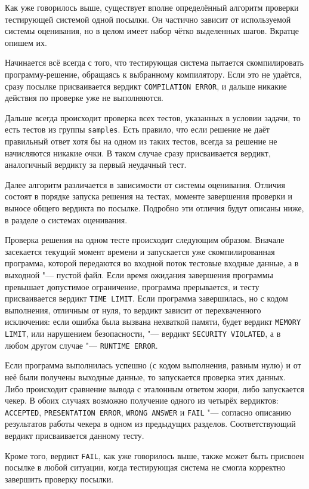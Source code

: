 Как уже говорилось выше, существует вполне определённый алгоритм проверки тестирующей системой одной посылки. Он частично зависит от используемой системы оценивания, но в целом имеет набор чётко выделенных шагов. Вкратце опишем их.

Начинается всё всегда с того, что тестирующая система пытается скомпилировать программу-решение, обращаясь к выбранному компилятору. Если это не удаётся, сразу посылке присваивается вердикт \texttt{COMPILATION ERROR}, и дальше никакие действия по проверке уже не выполняются.

Дальше всегда происходит проверка всех тестов, указанных в условии задачи, то есть тестов из группы \texttt{samples}. Есть правило, что если решение не даёт правильный ответ хотя бы на одном из таких тестов, всегда за решение не начисляются никакие очки. В таком случае сразу присваивается вердикт, аналогичный вердикту за первый неудачный тест.

Далее алгоритм различается в зависимости от системы оценивания. Отличия состоят в порядке запуска решения на тестах, моменте завершения проверки и выносе общего вердикта по посылке. Подробно эти отличия будут описаны ниже, в разделе о системах оценивания.

Проверка решения на одном тесте происходит следующим образом. Вначале засекается текущий момент времени и запускается уже скомпилированная программа, которой передаются во входной поток тестовые входные данные, а в выходной "--- пустой файл. Если время ожидания завершения программы превышает допустимое ограничение, программа прерывается, и тесту присваивается вердикт \texttt{TIME LIMIT}. Если программа завершилась, но с кодом выполнения, отличным от нуля, то вердикт зависит от перехваченного исключения: если ошибка была вызвана нехваткой памяти, будет вердикт \texttt{MEMORY LIMIT}, или нарушением безопасности, "--- вердикт \texttt{SECURITY VIOLATED}, а в любом другом случае "--- \texttt{RUNTIME ERROR}.

Если программа выполнилась успешно (с кодом выполнения, равным нулю) и от неё были получены выходные данные, то запускается проверка этих данных. Либо происходит сравнение вывода с эталонным ответом жюри, либо запускается чекер. В обоих случаях возможно получение одного из четырёх вердиктов: \texttt{ACCEPTED}, \texttt{PRESENTATION ERROR}, \texttt{WRONG ANSWER} и \texttt{FAIL} "--- согласно описанию результатов работы чекера в одном из предыдущих разделов. Соответствующий вердикт присваивается данному тесту.

Кроме того, вердикт \texttt{FAIL}, как уже говорилось выше, также может быть присвоен посылке в любой ситуации, когда тестирующая система не смогла корректно завершить проверку посылки.

